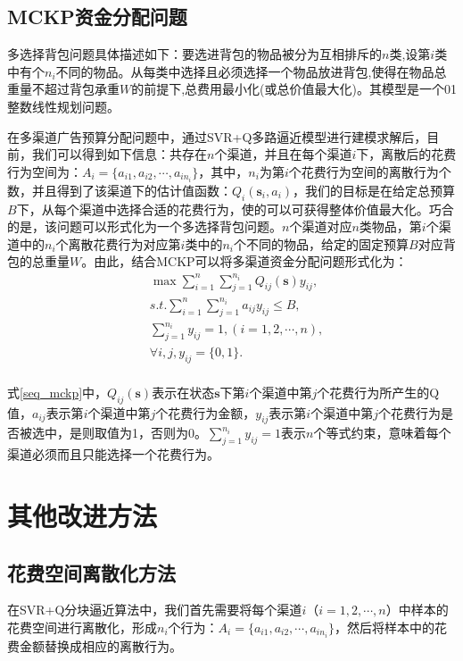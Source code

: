 \subsection{MCKP资金分配问题}
多选择背包问题具体描述如下：要选进背包的物品被分为互相排斥的$n$类,设第$i$类中有个$n_{i}$不同的物品。从每类中选择且必须选择一个物品放进背包,使得在物品总重量不超过背包承重$W$的前提下,总费用最小化(或总价值最大化)。其模型是一个01整数线性规划问题。

在多渠道广告预算分配问题中，通过SVR+Q多路逼近模型进行建模求解后，目前，我们可以得到如下信息：共存在$n$个渠道，并且在每个渠道$i$下，离散后的花费行为空间为：$A_{i}=\{a_{i1},a_{i2},\cdots,a_{i n_{i}}\}$，其中，$n_{i}$为第$i$个花费行为空间的离散行为个数，并且得到了该渠道下的估计值函数：$Q_{i}(\bm{s}_{i},a_{i})$，我们的目标是在给定总预算$B$下，从每个渠道中选择合适的花费行为，使的可以可获得整体价值最大化。巧合的是，该问题可以形式化为一个多选择背包问题。$n$个渠道对应$n$类物品，第$i$个渠道中的$n_{i}$个离散花费行为对应第$i$类中的$n_{i}$个不同的物品，给定的固定预算$B$对应背包的总重量$W$。由此，结合MCKP可以将多渠道资金分配问题形式化为：
\begin{equation}\label{seq_mckp}
\begin{split}
&\max \sum_{i=1}^{n}\sum_{j=1}^{n_{i}}Q_{ij}(\bm{s})y_{ij},\\
&s.t. \sum_{i=1}^{n}\sum_{j=1}^{n_{i}}a_{ij}y_{ij} \leqslant B,\\
&\sum_{j=1}^{n_{i}}y_{ij}=1,(i=1,2,\cdots,n),\\
&\forall i,j, y_{ij}=\{0,1\}.\\
\end{split}
\end{equation}

式\eqref{seq_mckp}中，$Q_{ij}(\bm{s})$表示在状态$\bm{s}$下第$i$个渠道中第$j$个花费行为所产生的Q值，$a_{ij}$表示第$i$个渠道中第$j$个花费行为金额，$y_{ij}$表示第$i$个渠道中第$j$个花费行为是否被选中，是则取值为1，否则为0。$\sum_{j=1}^{n_{i}}y_{ij}=1$表示$n$个等式约束，意味着每个渠道必须而且只能选择一个花费行为。

\section{其他改进方法}

\subsection{花费空间离散化方法}
在SVR+Q分块逼近算法中，我们首先需要将每个渠道$i$（$i=1,2,\cdots,n$）中样本的花费空间进行离散化，形成$n_{i}$个行为$：A_{i}=\{a_{i1},a_{i2},\cdots,a_{i n_{i}}\}$，然后将样本中的花费金额替换成相应的离散行为。

